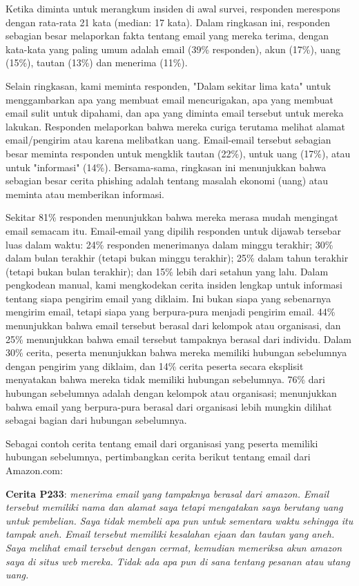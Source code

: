 \documentclass[lettersize,journal]{IEEEtran}
\begin{document}
Ketika diminta untuk merangkum insiden di awal survei, responden merespons
dengan rata-rata 21 kata (median: 17 kata). Dalam ringkasan ini, responden
sebagian besar melaporkan fakta tentang email yang mereka terima, dengan
kata-kata yang paling umum adalah email (39\% responden), akun (17\%), uang
(15\%), tautan (13\%) dan menerima (11\%).

Selain ringkasan, kami meminta responden, "Dalam sekitar lima kata" untuk
menggambarkan apa yang membuat email mencurigakan, apa yang membuat email sulit
untuk dipahami, dan apa yang diminta email tersebut untuk mereka lakukan.
Responden melaporkan bahwa mereka curiga terutama melihat alamat email/pengirim
atau karena melibatkan uang. Email-email tersebut sebagian besar meminta
responden untuk mengklik tautan (22\%), untuk uang (17\%), atau untuk
"informasi" (14\%). Bersama-sama, ringkasan ini menunjukkan bahwa sebagian
besar cerita phishing adalah tentang masalah ekonomi (uang) atau meminta atau
memberikan informasi.

Sekitar 81\% responden menunjukkan bahwa mereka merasa mudah mengingat email
semacam itu. Email-email yang dipilih responden untuk dijawab tersebar luas
dalam waktu: 24\% responden menerimanya dalam minggu terakhir; 30\% dalam bulan
terakhir (tetapi bukan minggu terakhir); 25\% dalam tahun terakhir (tetapi
bukan bulan terakhir); dan 15\% lebih dari setahun yang lalu. Dalam pengkodean
manual, kami mengkodekan cerita insiden lengkap untuk informasi tentang siapa
pengirim email yang diklaim. Ini bukan siapa yang sebenarnya mengirim email,
tetapi siapa yang berpura-pura menjadi pengirim email. 44\% menunjukkan bahwa
email tersebut berasal dari kelompok atau organisasi, dan 25\% menunjukkan
bahwa email tersebut tampaknya berasal dari individu. Dalam 30\% cerita,
peserta menunjukkan bahwa mereka memiliki hubungan sebelumnya dengan pengirim
yang diklaim, dan 14\% cerita peserta secara eksplisit menyatakan bahwa mereka
tidak memiliki hubungan sebelumnya. 76\% dari hubungan sebelumnya adalah dengan
kelompok atau organisasi; menunjukkan bahwa email yang berpura-pura berasal
dari organisasi lebih mungkin dilihat sebagai bagian dari hubungan sebelumnya.

Sebagai contoh cerita tentang email dari organisasi yang peserta memiliki
hubungan sebelumnya, pertimbangkan cerita berikut tentang email dari
Amazon.com:

\textbf{Cerita P233}: \textit{menerima email yang tampaknya berasal dari amazon. Email tersebut memiliki nama dan alamat saya tetapi mengatakan saya berutang uang untuk pembelian. Saya tidak membeli apa pun untuk sementara waktu sehingga itu tampak aneh. Email tersebut memiliki kesalahan ejaan dan tautan yang aneh. Saya melihat email tersebut dengan cermat, kemudian memeriksa akun amazon saya di situs web mereka. Tidak ada apa pun di sana tentang pesanan atau utang uang.}
\end{document}

